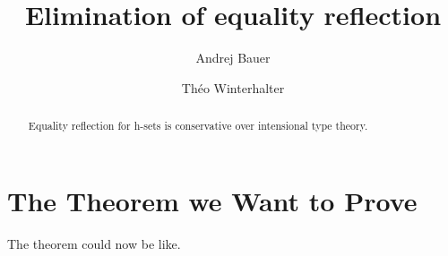 \documentclass{amsart}
\begin{document}
\title{Elimination of equality reflection}

\author{Andrej Bauer}
\address{Andrej Bauer\\University of Ljubljana\\Slovenia}

\author{Théo Winterhalter}
\address{Théo Winterhalter\\ENS Cachan, Université Paris-Saclay\\France}

\begin{abstract}
  Equality reflection for h-sets is conservative over intensional type theory.
\end{abstract}

\maketitle







\section{The Theorem we Want to Prove}

The theorem could now be like.
\end{document}
